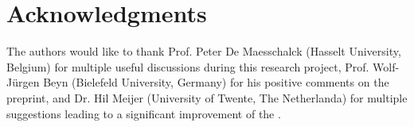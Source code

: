\section*{Acknowledgments}
The authors would like to thank Prof. Peter De Maesschalck (Hasselt University,
Belgium) for multiple useful discussions during this research project, Prof.
Wolf-J\"urgen Beyn (Bielefeld University, Germany) for his positive comments on
the preprint, and Dr. Hil Meijer (University of Twente, The Netherlanda) for
multiple suggestions leading to a significant improvement of the \paper{}.
